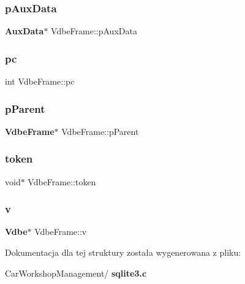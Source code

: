 \mbox{\label{struct_vdbe_frame_a199f005c277fcaeca33abf86c0a865bc}} 
\subsubsection{pAuxData}
{\footnotesize\ttfamily \textbf{ Aux\+Data}$\ast$ Vdbe\+Frame\+::p\+Aux\+Data}

\mbox{\label{struct_vdbe_frame_aed0e6d8cb1908580a3c2aca04516b46c}} 
\subsubsection{pc}
{\footnotesize\ttfamily int Vdbe\+Frame\+::pc}

\mbox{\label{struct_vdbe_frame_afb11d8aa920f34720333f52737375d59}} 
\subsubsection{pParent}
{\footnotesize\ttfamily \textbf{ Vdbe\+Frame}$\ast$ Vdbe\+Frame\+::p\+Parent}

\mbox{\label{struct_vdbe_frame_a11de10011ea2164995c6b616bba8a576}} 
\subsubsection{token}
{\footnotesize\ttfamily void$\ast$ Vdbe\+Frame\+::token}

\mbox{\label{struct_vdbe_frame_a2f6258356959c94398d1d006a740c4ce}} 
\subsubsection{v}
{\footnotesize\ttfamily \textbf{ Vdbe}$\ast$ Vdbe\+Frame\+::v}



Dokumentacja dla tej struktury została wygenerowana z pliku\+:\begin{DoxyCompactItemize}
\item 
Car\+Workshop\+Management/\textbf{ sqlite3.\+c}\end{DoxyCompactItemize}
